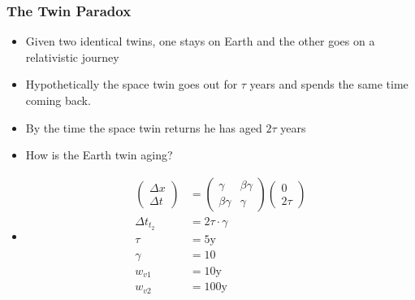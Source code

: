 \documentclass[12pt,letterpaper, twocolumn]{article}
\begin{document}
\subsubsection*{The Twin Paradox}
\begin{itemize}
    \item Given two identical twins, one stays on Earth and the other goes on a relativistic journey
    \item Hypothetically the space twin goes out for $\tau$ years and spends the same time coming back.
    \item By the time the space twin returns he has aged $2\tau$ years
    \item How is the Earth twin aging? 
    \item \begin{align*}
        \begin{pmatrix}\Delta x\\ \Delta t\end{pmatrix} &= \begin{pmatrix}\gamma & \beta \gamma\\ \beta \gamma & \gamma\end{pmatrix}\begin{pmatrix}0\\2\tau\end{pmatrix}\\
        \Delta t_{t_2} &= 2\tau \cdot \gamma\\
        \tau &= 5\text{y}\\
        \gamma &= 10\\
        w_{v1} &= 10\text{y}\\
        w_{v2} &= 100\text{y}\\
    \end{align*}
\end{itemize}
\end{document}

